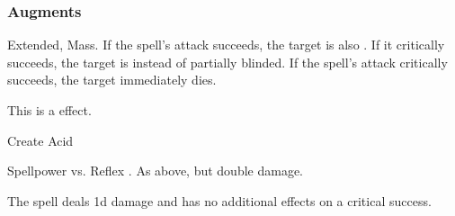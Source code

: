 \subsubsection{Augments}
 Extended, Mass.
If the spell's attack succeeds, the target is also \partiallyblinded. If it critically succeeds, the target is \blinded instead of partially blinded.
If the spell's attack critically succeeds, the target immediately dies.
\par
This is a  effect.
\begin{spellsection}{Create Acid}
\begin{spellheader}
\end{spellheader}
\begin{spellcontent}
\begin{spelltargetinginfo}
\end{spelltargetinginfo}
\begin{spelleffects}
\begin{spellattack}{Spellpower vs. Reflex}
\spellsuccess {}.
\spellcritical As above, but double damage.
\end{spellattack}
\end{spelleffects}
\end{spellcontent}
\begin{spellfooter}
\miscastexplode
\end{spellfooter}
\begin{spellcantrip}
The spell deals \minus1d damage and has no additional effects on a critical success.
\end{spellcantrip}
\end{spellsection}

